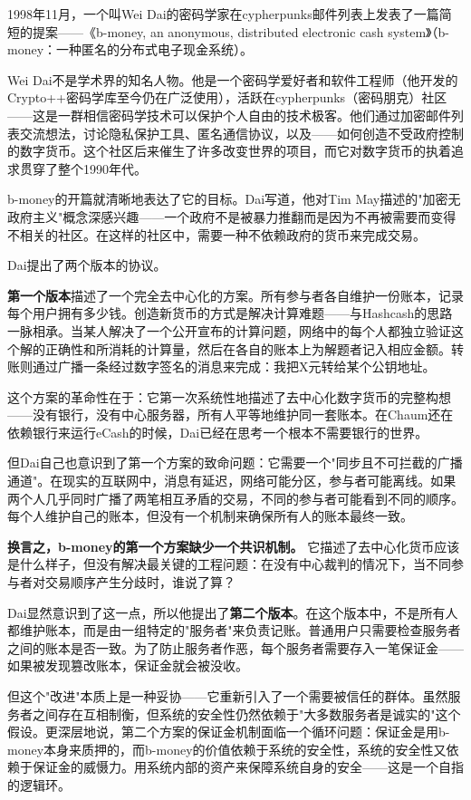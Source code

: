 \documentclass[a4paper,12pt,openany]{ctexbook}
\begin{document}
1998年11月，一个叫Wei Dai的密码学家在cypherpunks邮件列表上发表了一篇简短的提案——《b-money, an anonymous, distributed electronic cash system》（b-money：一种匿名的分布式电子现金系统）。

Wei Dai不是学术界的知名人物。他是一个密码学爱好者和软件工程师（他开发的Crypto++密码学库至今仍在广泛使用），活跃在cypherpunks（密码朋克）社区——这是一群相信密码学技术可以保护个人自由的技术极客。他们通过加密邮件列表交流想法，讨论隐私保护工具、匿名通信协议，以及——如何创造不受政府控制的数字货币。这个社区后来催生了许多改变世界的项目，而它对数字货币的执着追求贯穿了整个1990年代。

b-money的开篇就清晰地表达了它的目标。Dai写道，他对Tim May描述的"加密无政府主义"概念深感兴趣——一个政府不是被暴力推翻而是因为不再被需要而变得不相关的社区。在这样的社区中，需要一种不依赖政府的货币来完成交易。

Dai提出了两个版本的协议。

\textbf{第一个版本}描述了一个完全去中心化的方案。所有参与者各自维护一份账本，记录每个用户拥有多少钱。创造新货币的方式是解决计算难题——与Hashcash的思路一脉相承。当某人解决了一个公开宣布的计算问题，网络中的每个人都独立验证这个解的正确性和所消耗的计算量，然后在各自的账本上为解题者记入相应金额。转账则通过广播一条经过数字签名的消息来完成：我把X元转给某个公钥地址。

这个方案的革命性在于：它第一次系统性地描述了去中心化数字货币的完整构想——没有银行，没有中心服务器，所有人平等地维护同一套账本。在Chaum还在依赖银行来运行eCash的时候，Dai已经在思考一个根本不需要银行的世界。

但Dai自己也意识到了第一个方案的致命问题：它需要一个"同步且不可拦截的广播通道"。在现实的互联网中，消息有延迟，网络可能分区，参与者可能离线。如果两个人几乎同时广播了两笔相互矛盾的交易，不同的参与者可能看到不同的顺序。每个人维护自己的账本，但没有一个机制来确保所有人的账本最终一致。

\textbf{换言之，b-money的第一个方案缺少一个共识机制。} 它描述了去中心化货币应该是什么样子，但没有解决最关键的工程问题：在没有中心裁判的情况下，当不同参与者对交易顺序产生分歧时，谁说了算？

Dai显然意识到了这一点，所以他提出了\textbf{第二个版本}。在这个版本中，不是所有人都维护账本，而是由一组特定的"服务者"来负责记账。普通用户只需要检查服务者之间的账本是否一致。为了防止服务者作恶，每个服务者需要存入一笔保证金——如果被发现篡改账本，保证金就会被没收。

但这个"改进"本质上是一种妥协——它重新引入了一个需要被信任的群体。虽然服务者之间存在互相制衡，但系统的安全性仍然依赖于"大多数服务者是诚实的"这个假设。更深层地说，第二个方案的保证金机制面临一个循环问题：保证金是用b-money本身来质押的，而b-money的价值依赖于系统的安全性，系统的安全性又依赖于保证金的威慑力。用系统内部的资产来保障系统自身的安全——这是一个自指的逻辑环。
\end{document}
